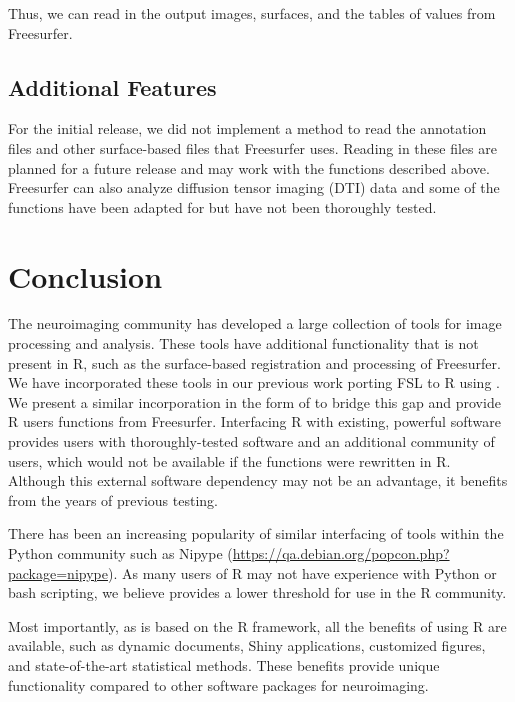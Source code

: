 Thus, we can read in the output images, surfaces, and the tables of
values from Freesurfer.

\subsection{Additional Features}\label{additional-features}

For the initial release, we did not implement a method to read the
annotation files and other surface-based files that Freesurfer uses.
Reading in these files are planned for a future release and may work
with the functions described above. Freesurfer can also analyze
diffusion tensor imaging (DTI) data and some of the functions have been
adapted for  but have not been thoroughly tested.

\section{Conclusion}\label{conclusion}

The neuroimaging community has developed a large collection of tools for
image processing and analysis. These tools have additional functionality
that is not present in R, such as the surface-based registration and
processing of Freesurfer. We have incorporated these tools in our
previous work porting FSL to R using . We present a similar
incorporation in the form of  to bridge this gap and
provide R users functions from Freesurfer. Interfacing R with existing,
powerful software provides users with thoroughly-tested software and an
additional community of users, which would not be available if the
functions were rewritten in R. Although this external software
dependency may not be an advantage, it benefits from the years of
previous testing.

There has been an increasing popularity of similar interfacing of tools
within the Python community such as Nipype
\citep{gorgolewski_nipype:_2011}
(\url{https://qa.debian.org/popcon.php?package=nipype}). As many users
of R may not have experience with Python or bash scripting, we believe
 provides a lower threshold for use in the R community.

Most importantly, as  is based on the R framework, all
the benefits of using R are available, such as dynamic documents, Shiny
applications, customized figures, and state-of-the-art statistical
methods. These benefits provide unique functionality compared to other
software packages for neuroimaging.

